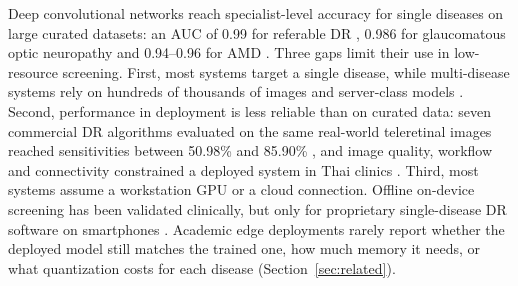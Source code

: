 \documentclass[a4paper,fleqn]{cas-sc}
\begin{document}
Deep convolutional networks reach specialist-level accuracy for single
diseases on large curated datasets: an AUC of 0.99 for referable DR
\cite{gulshan2016development}, 0.986 for glaucomatous optic neuropathy
\cite{li2018efficacy} and 0.94--0.96 for AMD \cite{burlina2017automated}.
Three gaps limit their use in low-resource screening. First, most systems
target a single disease, while multi-disease systems rely on hundreds of
thousands of images and server-class models
\cite{ting2017development,cen2021automatic}. Second, performance in
deployment is less reliable than on curated data: seven commercial DR
algorithms evaluated on the same real-world teleretinal images reached
sensitivities between 50.98\% and 85.90\% \cite{lee2021multicenter}, and
image quality, workflow and connectivity constrained a deployed system in
Thai clinics \cite{beede2020human}. Third, most systems assume a
workstation GPU or a cloud connection. Offline on-device screening has
been validated clinically, but only for proprietary single-disease DR
software on smartphones \cite{natarajan2019diagnostic,sosale2020simple}.
Academic edge deployments rarely report whether the deployed model still
matches the trained one, how much memory it needs, or what quantization
costs for each disease (Section~\ref{sec:related}).
\end{document}
